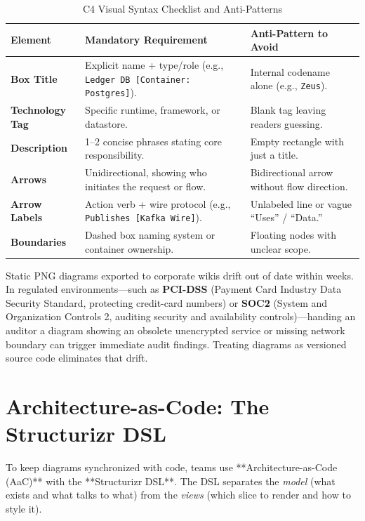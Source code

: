 \begin{table}[htbp]
\centering\small
\begin{tabular}{lp{5.5cm}p{5.5cm}}
\toprule
\textbf{Element} & \textbf{Mandatory Requirement} & \textbf{Anti-Pattern to Avoid} \\
\midrule
\textbf{Box Title} & Explicit name + type/role (e.g., \texttt{Ledger DB [Container: Postgres]}). & Internal codename alone (e.g., \texttt{Zeus}). \\
\textbf{Technology Tag} & Specific runtime, framework, or datastore. & Blank tag leaving readers guessing. \\
\textbf{Description} & 1--2 concise phrases stating core responsibility. & Empty rectangle with just a title. \\
\textbf{Arrows} & Unidirectional, showing who initiates the request or flow. & Bidirectional arrow without flow direction. \\
\textbf{Arrow Labels} & Action verb + wire protocol (e.g., \texttt{Publishes [Kafka Wire]}). & Unlabeled line or vague ``Uses'' / ``Data.'' \\
\textbf{Boundaries} & Dashed box naming system or container ownership. & Floating nodes with unclear scope. \\
\bottomrule
\end{tabular}
\caption{C4 Visual Syntax Checklist and Anti-Patterns}
\label{tab:v5-ch02-syntax-checklist}
\end{table}

\begin{productionwarningbox}
Static PNG diagrams exported to corporate wikis drift out of date within weeks. In regulated environments---such as \textbf{PCI-DSS} (Payment Card Industry Data Security Standard, protecting credit-card numbers) or \textbf{SOC2} (System and Organization Controls 2, auditing security and availability controls)---handing an auditor a diagram showing an obsolete unencrypted service or missing network boundary can trigger immediate audit findings. Treating diagrams as versioned source code eliminates that drift.
\end{productionwarningbox}

\section{Architecture-as-Code: The Structurizr DSL}

To keep diagrams synchronized with code, teams use **Architecture-as-Code (AaC)** with the **Structurizr DSL**. The DSL separates the \emph{model} (what exists and what talks to what) from the \emph{views} (which slice to render and how to style it).

